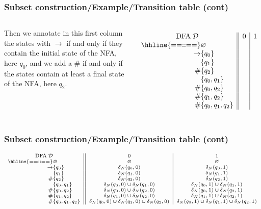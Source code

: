 %
\begin{frame}
\frametitle{Subset construction/Example/Transition table (cont)}

\begin{columns}

   Then we annotate in this first column the
  states with \(\rightarrow\) if and only if they contain the initial
  state of the NFA, here \(q_0\), and we add a \(\#\) if and only if
  the states contain at least a final state of the NFA, here \(q_2\).

  \[
  \begin{array}{r@{}l||c|c}
    \multicolumn{2}{c||}{\text{DFA} \; {\cal D}} & 0 & 1\\
    \hhline{==::==}
    & \varnothing & &\\
    \rightarrow & \{q_0\}  & &\\
       & \{q_1\}           & &\\
    \# & \{q_2\}           & &\\
       & \{q_0, q_1\}      & &\\
    \# & \{q_0, q_2\}      & &\\
    \# & \{q_1, q_2\}      & &\\
    \# & \{q_0, q_1, q_2\} & &
  \end{array}
  \]
\end{columns}

\end{frame}

%
\begin{frame}
\frametitle{Subset construction/Example/Transition table (cont)}
\[
\scriptsize
\begin{array}{r@{}l||c|c}
\multicolumn{2}{c||}{\text{DFA} \; {\cal D}} & 0 & 1\\
\hhline{==::==}
            & \varnothing & \varnothing & \varnothing\\
\rightarrow & \{q_0\} & \delta_N(q_0, 0) & \delta_N(q_0, 1)\\
            & \{q_1\} & \delta_N(q_1, 0) & \delta_N(q_1, 1)\\
         \# & \{q_2\} & \delta_N(q_2, 0) & \delta_N(q_2, 1)\\
            & \{q_0, q_1\} & \delta_N(q_0,0) \cup \delta_N(q_1,0)
                           & \delta_N(q_0,1) \cup \delta_N(q_1,1)\\
         \# & \{q_0, q_2\} & \delta_N(q_0,0) \cup \delta_N(q_2,0)
                           & \delta_N(q_0,1) \cup \delta_N(q_2,1)\\
         \# & \{q_1, q_2\} & \delta_N(q_1,0) \cup \delta_N(q_2,0)
                           & \delta_N(q_1,1) \cup \delta_N(q_2,1)\\
         \# & \{q_0, q_1, q_2\}
            & \delta_N(q_0,0) \cup \delta_N(q_1,0) \cup \delta_N(q_2,0)
            & \delta_N(q_0,1) \cup \delta_N(q_1,1) \cup \delta_N(q_2,1)
\end{array}
\]

\end{frame}

